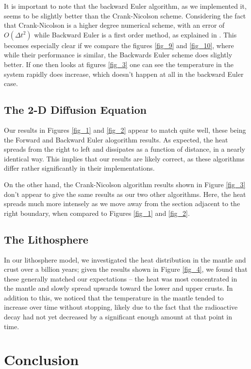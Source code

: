 \documentclass[a4paper,10pt,english]{article}
\begin{document}
It is important to note that the backward Euler algorithm, as we implemented it, seems to be slightly better than the Crank-Nicolson scheme. Considering the fact that Crank-Nicolson is a higher degree numerical scheme, with an error of $O(\Delta t^2)$ while Backward Euler is a first order method, as explained in \cite{compendium}. This becomes especially clear if we compare the figures \ref{fig_9} and \ref{fig_10}, where while their performance is similar, the Backwards Euler scheme does slightly better. If one then looks at figures \ref{fig_3} one can see the temperature in the system rapidly does increase, which doesn't happen at all in the backward Euler case. 
\subsection*{The 2-D Diffusion Equation}

Our results in Figures \ref{fig_1} and \ref{fig_2} appear to match quite well, these being the Forward and Backward Euler alogorithm results.  As expected, the heat spreads from the right to left and dissipates as a function of distance, in a nearly identical way.  This implies that our results are likely correct, as these algorithms differ rather significantly in their implementations.

On the other hand, the Crank-Nicolson algorithm results shown in Figure \ref{fig_3} don't appear to give the same results as our two other algorithms.  Here, the heat spreads much more intensely as we move away from the section adjacent to the right boundary, when compared to Figures \ref{fig_1} and \ref{fig_2}.

\subsection*{The Lithosphere}

In our lithosphere model, we investigated the heat distribution in the mantle and crust over a billion years; given the results shown in Figure \ref{fig_4}, we found that these generally matched our expectations – the heat was most concentrated in the mantle and slowly spread upwards toward the lower and upper crusts.  In addition to this, we noticed that the temperature in the mantle tended to increase over time without stopping, likely due to the fact that the radioactive decay had not yet decreased by a significant enough amount at that point in time.

\section*{Conclusion}
\end{document}
